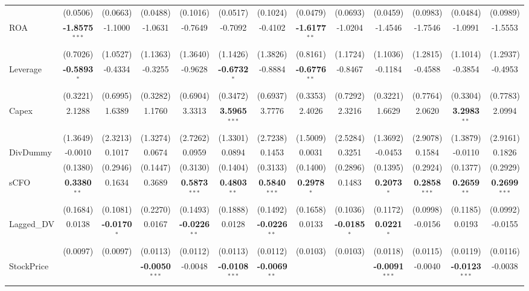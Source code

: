 \begin{landscape}
\begin{table}[H]
\begin{tabular}{lcccccccccccc}
 & (0.0506) & (0.0663) & (0.0488) & (0.1016) & (0.0517) & (0.1024) & (0.0479) & (0.0693) & (0.0459) & (0.0983) & (0.0484) & (0.0989) \\
ROA & \textbf{-1.8575}$^{***}$ & -1.1000 & -1.0631 & -0.7649 & -0.7092 & -0.4102 & \textbf{-1.6177}$^{**}$ & -1.0204 & -1.4546 & -1.7546 & -1.0991 & -1.5553 \\
 & (0.7026) & (1.0527) & (1.1363) & (1.3640) & (1.1426) & (1.3826) & (0.8161) & (1.1724) & (1.1036) & (1.2815) & (1.1014) & (1.2937) \\
Leverage & \textbf{-0.5893}$^{*}$ & -0.4334 & -0.3255 & -0.9628 & \textbf{-0.6732}$^{*}$ & -0.8884 & \textbf{-0.6776}$^{**}$ & -0.8467 & -0.1184 & -0.4588 & -0.3854 & -0.4953 \\
 & (0.3221) & (0.6995) & (0.3282) & (0.6904) & (0.3472) & (0.6937) & (0.3353) & (0.7292) & (0.3221) & (0.7764) & (0.3304) & (0.7783) \\
Capex & 2.1288 & 1.6389 & 1.1760 & 3.3313 & \textbf{3.5965}$^{***}$ & 3.7776 & 2.4026 & 2.3216 & 1.6629 & 2.0620 & \textbf{3.2983}$^{**}$ & 2.0994 \\
 & (1.3649) & (2.3213) & (1.3274) & (2.7262) & (1.3301) & (2.7238) & (1.5009) & (2.5284) & (1.3692) & (2.9078) & (1.3879) & (2.9161) \\
DivDummy & -0.0010 & 0.1017 & 0.0674 & 0.0959 & 0.0894 & 0.1453 & 0.0031 & 0.3251 & -0.0453 & 0.1584 & -0.0110 & 0.1826 \\
 & (0.1380) & (0.2946) & (0.1447) & (0.3130) & (0.1404) & (0.3133) & (0.1400) & (0.2896) & (0.1395) & (0.2924) & (0.1377) & (0.2929) \\
sCFO & \textbf{0.3380}$^{**}$ & 0.1634 & 0.3689 & \textbf{0.5873}$^{***}$ & \textbf{0.4803}$^{**}$ & \textbf{0.5840}$^{***}$ & \textbf{0.2978}$^{*}$ & 0.1483 & \textbf{0.2073}$^{*}$ & \textbf{0.2858}$^{***}$ & \textbf{0.2659}$^{**}$ & \textbf{0.2699}$^{***}$ \\
 & (0.1684) & (0.1081) & (0.2270) & (0.1493) & (0.1888) & (0.1492) & (0.1658) & (0.1036) & (0.1172) & (0.0998) & (0.1185) & (0.0992) \\
Lagged\_DV & 0.0138 & \textbf{-0.0170}$^{*}$ & 0.0167 & \textbf{-0.0226}$^{**}$ & 0.0128 & \textbf{-0.0226}$^{**}$ & 0.0133 & \textbf{-0.0185}$^{*}$ & \textbf{0.0221}$^{*}$ & -0.0156 & 0.0193 & -0.0155 \\
 & (0.0097) & (0.0097) & (0.0113) & (0.0112) & (0.0113) & (0.0112) & (0.0103) & (0.0103) & (0.0118) & (0.0115) & (0.0119) & (0.0116) \\
StockPrice &  &  & \textbf{-0.0050}$^{***}$ & -0.0048 & \textbf{-0.0108}$^{***}$ & \textbf{-0.0069}$^{**}$ &  &  & \textbf{-0.0091}$^{***}$ & -0.0040 & \textbf{-0.0123}$^{***}$ & -0.0038 \\

\end{tabular}
\end{table}
\end{landscape}
